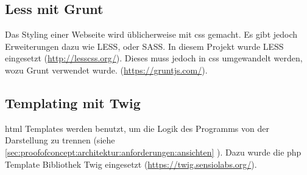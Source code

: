 \subsection{Less mit Grunt}
Das Styling einer Webseite wird üblicherweise mit \gls{css} gemacht. Es gibt jedoch Erweiterungen dazu wie LESS, oder SASS. In diesem Projekt wurde LESS eingesetzt (\url{http://lesscss.org/}). Dieses muss jedoch in \gls{css} umgewandelt werden, wozu Grunt verwendet wurde. (\url{https://gruntjs.com/}).

\subsection{Templating mit Twig}
\label{sec:proofofconcept:externebibliotheken:twig}
\gls{html} Templates werden benutzt, um die Logik des Programms von der Darstellung zu trennen (siehe \cref{sec:proofofconcept:architektur:anforderungen:ansichten} ). Dazu wurde die \gls{php} Template Bibliothek Twig eingesetzt (\url{https://twig.sensiolabs.org/}).

